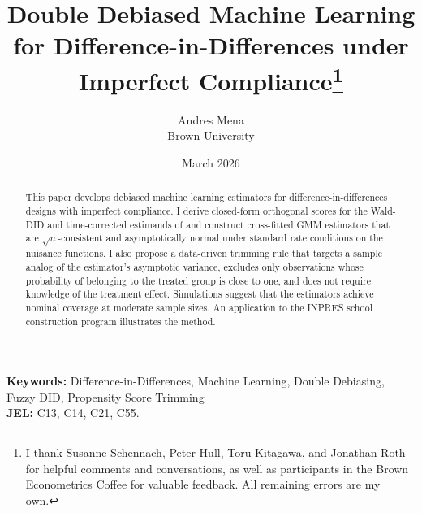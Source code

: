 \documentclass[reqno,12pt]{article}
\theoremstyle{plain}
\theoremstyle{definition}
\theoremstyle{proofstyle}
\begin{document}
 
\title{Double Debiased Machine Learning for Difference-in-Differences under Imperfect Compliance\thanks{I thank Susanne Schennach, Peter Hull, Toru Kitagawa, and Jonathan Roth for helpful comments and conversations, as well as participants in the Brown Econometrics Coffee for valuable feedback. All remaining errors are my own.}}
\author{Andres Mena\\Brown University}
\date{March 2026}
\maketitle

\begin{abstract}
\noindent This paper develops debiased machine learning estimators for difference-in-differences designs with imperfect compliance. I derive closed-form orthogonal scores for the Wald-DID and time-corrected estimands of \citet{fuzzy2018} and construct cross-fitted GMM estimators that are $\sqrt{n}$-consistent and asymptotically normal under standard rate conditions on the nuisance functions. I also propose a data-driven trimming rule that targets a sample analog of the estimator's asymptotic variance, excludes only observations whose probability of belonging to the treated group is close to one, and does not require knowledge of the treatment effect. Simulations suggest that the estimators achieve nominal coverage at moderate sample sizes. An application to the INPRES school construction program illustrates the method.
\end{abstract}

\medskip
\noindent\textbf{Keywords:} Difference-in-Differences, Machine Learning, Double Debiasing, Fuzzy DID, Propensity Score Trimming\\
\noindent\textbf{JEL:} C13, C14, C21, C55.

\newpage
\onehalfspacing










\newpage



\newpage
\appendix
\renewcommand{\thesection}{\Alph{section}}
\renewcommand{\thesubsection}{\Alph{section}.\arabic{subsection}}
\renewcommand{\thefigure}{\thesection.\arabic{figure}}
\renewcommand{\thetable}{\thesection.\arabic{table}}






\end{document}
